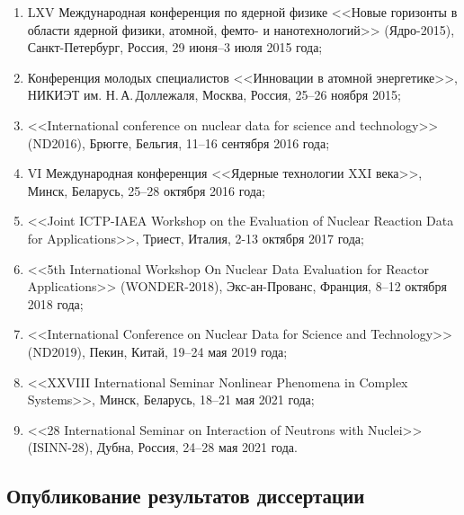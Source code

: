 \begin{enumerate}
	\item LXV Международная конференция по ядерной физике <<Новые горизонты в области ядерной физики, атомной, фемто- и нанотехнологий>> (Ядро-2015), Санкт-Петербург, Россия, 29 июня--3 июля 2015 года;
	
	\item Конференция молодых специалистов <<Инновации в атомной энергетике>>, НИКИЭТ им. Н.\,А.\,Доллежаля, Москва, Россия, 25--26 ноября 2015;
	
	\item <<International conference on nuclear data for science and technology>> (ND2016), Брюгге, Бельгия, 11--16 сентября 2016 года;
	
	\item VI Международная конференция <<Ядерные технологии XXI века>>, Минск,  Беларусь, 25--28 октября 2016 года;
	
	\item <<Joint ICTP-IAEA Workshop on the Evaluation of Nuclear Reaction Data for Applications>>, Триест, Италия, 2-13 октября 2017 года;
	
	\item <<5th International Workshop On Nuclear Data Evaluation for Reactor Applications>> (WONDER-2018), Экс-ан-Прованс, Франция, 8--12 октября 2018 года;
	
	\item <<International Conference on Nuclear Data for Science and Technology>> (ND2019), Пекин, Китай, 19--24 мая 2019 года;
	
	\item <<XXVIII International Seminar Nonlinear Phenomena in Complex Systems>>, Минск, Беларусь, 18--21 мая 2021 года;
	
	\item <<28 International Seminar on Interaction of Neutrons with Nuclei>> (ISINN-28), Дубна, Россия, 24--28 мая 2021 года.
\end{enumerate}


\subsection*{Опубликование результатов диссертации}

